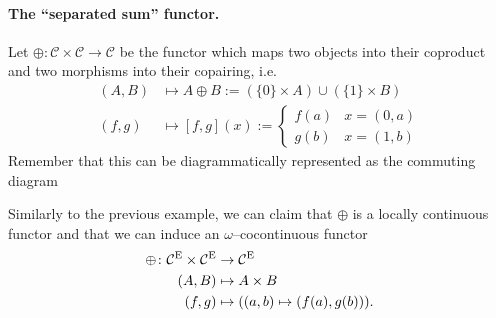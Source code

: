 \paragraph{The ``separated sum'' functor.}
Let \(\oplus \colon \mathcal{C} \times \mathcal{C} \to \mathcal{C}\) be the functor which maps two objects into their coproduct and two morphisms into their copairing, i.e.
\begin{align*}
  (A,B) &\mapsto A \oplus B := (\lbrace 0 \rbrace \times A) \cup (\lbrace 1 \rbrace \times B) \\
  (f,g) &\mapsto [f,g](x) :=
  \begin{cases}
    f(a) & x = (0,a) \\ g(b) & x = (1,b)
  \end{cases}
\end{align*}
Remember that this can be diagrammatically represented as the commuting diagram
\begin{center}
\end{center}
Similarly to the previous example, we can claim that \(\oplus\) is a locally continuous functor and that we can induce an \(\omega\)--cocontinuous functor
\begin{equation*}
  \begin{split}
    \oplus \colon \mathcal{C}^\textup{E} \times \mathcal{C}^\textup{E} &\to \mathcal{C}^\textup{E} \\
    (A,B) &\mapsto A \times B \\
    (f,g) &\mapsto ((a,b) \mapsto (f(a),g(b))).
\end{split}
\end{equation*}
